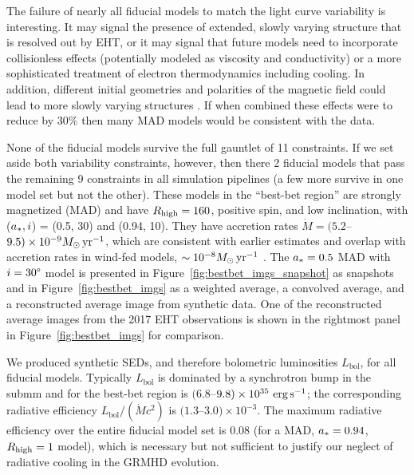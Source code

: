 The failure of nearly all fiducial models to match the light curve variability is interesting.
It may signal the presence of extended, slowly varying structure that is resolved out by EHT, or it may signal that future models need to incorporate collisionless effects (potentially modeled as viscosity and conductivity) or a more sophisticated treatment of electron thermodynamics including cooling. In addition, different initial geometries and polarities of the magnetic field could lead to more slowly varying structures \citep{2021arXiv211103689N}. If when combined these effects were to reduce  by 30\% then many MAD models would be consistent with the data.

None of the fiducial models survive the full gauntlet of 11 constraints.
If we set aside both variability constraints, however, then there 2 fiducial models that pass the remaining 9 constraints in all simulation pipelines (a few more survive in one model set but not the other).
These models in the ``best-bet region'' are strongly magnetized (MAD) and have $R_\mathrm{high} = 160$, positive spin, and low inclination, with ($a_*, i$) = (0.5, 30\degree) and (0.94, 10\degree).
They have accretion rates $\dot{M} = (5.2$--$9.5)\times 10^{-9}M_\odot\,\mathrm{yr}^{-1}$, which are consistent with earlier estimates and overlap with accretion rates in wind-fed models, $\sim 10^{-8} M_\odot\,\mathrm{yr}^{-1}$ \citep{2020ApJ...896L...6R}.
The $a_* = 0.5$ MAD with $i=30\degree$ model is presented in Figure~\ref{fig:bestbet_imgs_snapshot} as snapshots and in Figure~\ref{fig:bestbet_imgs} as a weighted average, a convolved average, and a reconstructed average image from synthetic data.
One of the reconstructed average images from the 2017 EHT observations is shown in the rightmost panel in Figure~\ref{fig:bestbet_imgs} for comparison.

We produced synthetic SEDs, and therefore bolometric luminosities $L_\mathrm{bol}$, for all fiducial models.
Typically $L_\mathrm{bol}$ is dominated by a synchrotron bump in the submm and for the best-bet region is $(6.8$--$9.8)\times10^{35}\,\,\mathrm{erg}\,\mathrm{s}^{-1}$; the corresponding radiative efficiency $L_\mathrm{bol}/(\dot{M} c^2)$ is $(1.3$--$3.0)\times 10^{-3}$.
The maximum radiative efficiency over the entire fiducial model set is 0.08 (for a MAD, $a_* = 0.94$, $R_\mathrm{high} = 1$ model), which is necessary but not sufficient to justify our neglect of radiative cooling in the GRMHD evolution.

